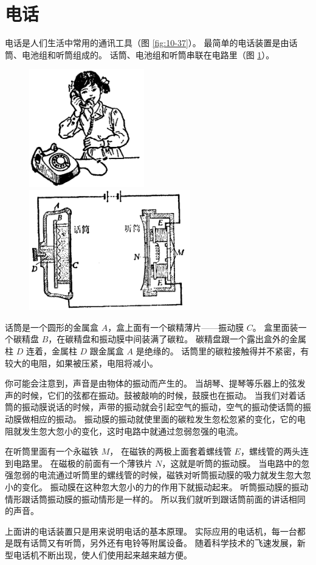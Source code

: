 \section{电话}\label{sec:10-8}

电话是人们生活中常用的通讯工具（图 \ref{fig:10-37}）。
最简单的电话装置是由话筒、电池组和听筒组成的。
话筒、电池组和听筒串联在电路里（图 \ref{fig:10-38}）。

\begin{figure}[htbp]
    \centering
    \begin{minipage}{6cm}
    \centering
    \includegraphics[width=5cm]{../pic/czwl2-ch10-37}
    \caption{}\label{fig:10-37}
    \end{minipage}
    \qquad
    \begin{minipage}{8cm}
    \centering
    \includegraphics[width=7cm]{../pic/czwl2-ch10-38}
    \caption{}\label{fig:10-38}
    \end{minipage}
\end{figure}


话筒是一个圆形的金属盒 $A$，盒上面有一个碳精薄片——振动膜 $C$。
盒里面装一个碳精盘 $B$，在碳精盘和振动膜中间装满了碳粒。
碳精盘跟一个露出盒外的金属柱 $D$ 连着，金属柱 $D$ 跟金属盒 $A$ 是绝缘的。
话筒里的碳粒接触得并不紧密，有较大的电阻，如果被压紧，电阻将减小。

你可能会注意到，声音是由物体的振动而产生的。
当胡琴、提琴等乐器上的弦发声的时候，它们的弦都在振动。鼓被敲响的时候，鼓膜也在振动。
当我们对着话筒的振动膜说话的时候，声带的振动就会引起空气的振动，空气的振动使话筒的振动膜做相应的振动。
振动膜的振动就使里面的碳粒发生忽松忽紧的变化，它的电阻就发生忽大忽小的变化，这时电路中就通过忽弱忽强的电流。

在听筒里面有一个永磁铁 $M$， 在磁铁的两极上面套着螺线管 $E$，螺线管的两头连到电路里。
在磁极的前面有一个薄铁片 $N$，这就是听筒的振动膜。
当电路中的忽强忽弱的电流通过听筒里的螺线管的时候，磁铁对听筒振动膜的吸力就发生忽大忽小的变化。
振动膜在这种忽大忽小的力的作用下就振动起来。
听筒振动膜的振动情形跟话筒振动膜的振动情形是一样的。
所以我们就听到跟话筒前面的讲话相同的声音。

上面讲的电话装置只是用来说明电话的基本原理。
实际应用的电话机，每一台都是既有话筒又有听筒，另外还有电铃等附属设备。
随着科学技术的飞速发展，新型电话机不断出现，使人们使用起来越来越方便。

